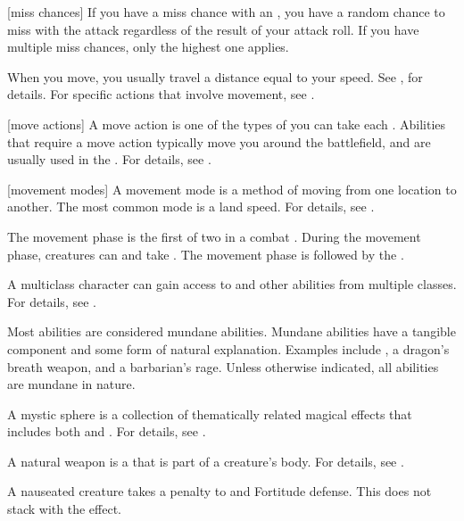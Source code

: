 [miss chances] If you have a miss chance with an , you have a random chance to miss with the attack regardless of the result of your attack roll.
If you have multiple miss chances, only the highest one applies.

 When you move, you usually travel a distance equal to your speed.
See , for details.
For specific actions that involve movement, see .

[move actions] A move action is one of the types of  you can take each .
Abilities that require a move action typically move you around the battlefield, and are usually used in the .
For details, see .

[movement modes] A movement mode is a method of moving from one location to another.
The most common mode is a land speed.
For details, see .

 The movement phase is the first of two  in a combat .
During the movement phase, creatures can  and take .
The movement phase is followed by the .

 A multiclass character can gain access to  and other abilities from multiple classes.
For details, see .

 Most abilities are considered mundane abilities.
Mundane abilities have a tangible component and some form of natural explanation.
Examples include , a dragon's breath weapon, and a barbarian's rage.
Unless otherwise indicated, all abilities are mundane in nature.

 A mystic sphere is a collection of thematically related magical effects that includes both  and .
For details, see .

 A natural weapon is a  that is part of a creature's body.
For details, see .

 A nauseated creature takes a  penalty to  and Fortitude defense.
This does not stack with the  effect.

